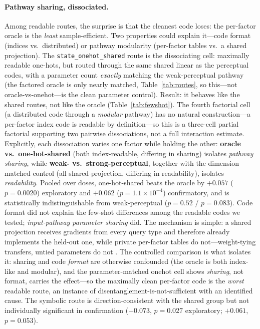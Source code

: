 \documentclass[10pt]{article} %
\begin{document}
\paragraph{Pathway sharing, dissociated.} Among readable routes, the surprise is that the cleanest
code loses: the per-factor oracle is the \emph{least} sample-efficient. Two properties could
explain it---code format (indices vs.\ distributed) or pathway modularity (per-factor tables vs.\ a
shared projection). The \texttt{state\_onehot\_shared} route is the dissociating cell: maximally
readable one-hots, but routed through the same shared linear as the perceptual codes, with a
parameter count \emph{exactly} matching the weak-perceptual pathway (the factored oracle is only
nearly matched, Table~\ref{tab:routes}, so this---not oracle-vs-onehot---is the clean parameter
control). Result: it behaves like the shared routes, not like the oracle (Table~\ref{tab:fewshot}).
The fourth factorial cell (a distributed code through a \emph{modular} pathway) has no natural
construction---a per-factor index code is readable by definition---so this is a three-cell partial
factorial supporting two pairwise dissociations, not a full interaction estimate. Explicitly, each
dissociation varies one factor while holding the other: \textbf{oracle vs.\ one-hot-shared} (both
index-readable, differing in sharing) isolates \emph{pathway sharing}, while \textbf{weak- vs.\
strong-perceptual}, together with the dimension-matched control (all shared-projection, differing in
readability), isolates \emph{readability}. Pooled over doses, one-hot-shared beats the
oracle by $+0.057$ ($p = 0.0020$) exploratory and $+0.062$ ($p = 1.1\times10^{-4}$) confirmatory,
and is statistically indistinguishable from weak-perceptual ($p = 0.52$ / $p = 0.083$). Code format
did not explain the few-shot differences among the readable codes we tested;
\emph{input-pathway parameter sharing} did. The
mechanism is simple: a shared projection receives gradients from every query type and therefore
already implements the held-out one, while private per-factor tables do not---weight-tying
transfers, untied parameters do not \citep{csordas2021devil}. The controlled comparison is what
isolates it: sharing and code \emph{format} are otherwise confounded (the oracle is both index-like
and modular), and the parameter-matched onehot cell shows \emph{sharing}, not format, carries the
effect---so the maximally clean per-factor code is the \emph{worst} readable route, an instance of
disentanglement-is-not-sufficient \citep{montero2021role} with an identified cause. The symbolic
route is direction-consistent with the shared group but not individually significant in confirmation
($+0.073$, $p = 0.027$ exploratory; $+0.061$, $p = 0.053$).
\end{document}
